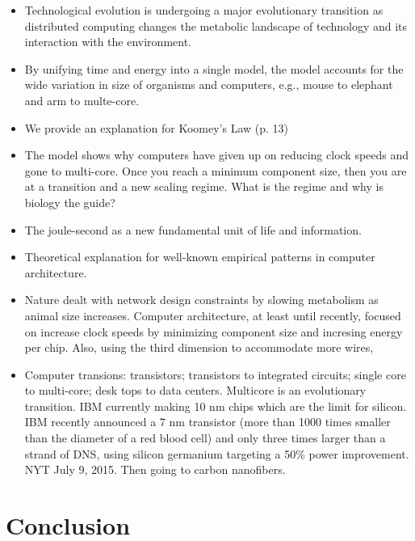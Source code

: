 \documentclass[12pt]{article}
\begin{document}
\begin{itemize} 
  
  \item Technological evolution is undergoing a major evolutionary transition as distributed computing changes the metabolic landscape of technology and its interaction with the environment. 
  
\item By unifying time and energy into a single model, the model accounts for
  the wide variation in size of organisms and computers, e.g., mouse to
  elephant and arm to multe-core.

\item We provide an explanation for Koomey's Law (p. 13)

\item The model shows why computers have given up on reducing clock speeds and
  gone to multi-core.  Once you reach a minimum component size, then you are at
  a transition and a new scaling regime.  What is the regime and why is biology
  the guide?

\item The joule-second as a new fundamental unit of life and information.

\item Theoretical explanation for well-known empirical patterns in computer
  architecture.

\item Nature dealt with network design constraints by slowing metabolism as
  animal size increases.  Computer architecture, at least until recently,
  focused on increase clock speeds by minimizing component size and incresing
  energy per chip.  Also, using the third dimension to accommodate more wires, 

\item Computer transions: transistors; transistors to integrated circuits;
  single core to multi-core; desk tops to data centers.  Multicore is an
  evolutionary transition.  IBM currently making 10 nm chips which are the
  limit for silicon.  IBM recently announced a 7 nm transistor (more than 1000
  times smaller than the diameter of a red blood cell) and only three times
  larger than a strand of DNS, using silicon germanium targeting a 50\% power
  improvement.  NYT July 9, 2015.  Then going to carbon nanofibers. 

\end{itemize}

\section{Conclusion}
\end{document}
